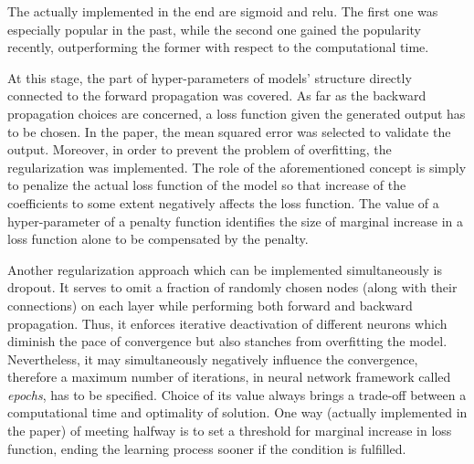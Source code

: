 \documentclass{Trade_template}
\numberwithin{equation}{section}
\begin{document}

The actually implemented in the end are sigmoid and relu. The first one was especially popular in the past, while the second one gained the popularity recently, outperforming the former with respect to the computational time.

At this stage, the part of hyper-parameters of models’ structure directly connected to the forward propagation was covered. As far as the backward propagation choices are concerned, a loss function given the generated output has to be chosen. In the paper, the mean squared error was selected to validate the output. Moreover, in order to prevent the problem of overfitting, the regularization was implemented. The role of the aforementioned concept is simply to penalize the actual loss function of the model so that increase of the coefficients to some extent negatively affects the loss function. The value of a hyper-parameter of a penalty function identifies the size of marginal increase in a loss function alone to be compensated by the penalty. 

Another regularization approach which can be implemented simultaneously is dropout. It serves to omit a fraction of randomly chosen nodes (along with their connections) on each layer while performing both forward and backward propagation. Thus, it enforces iterative deactivation of different neurons which diminish the pace of convergence but also stanches from overfitting the model. Nevertheless, it may simultaneously negatively influence the convergence, therefore a maximum number of iterations, in neural network framework called \textit{epochs}, has to be specified. Choice of its value always brings a trade-off between a computational time and optimality of solution. One way (actually implemented in the paper) of meeting halfway is to set a threshold for marginal increase in loss function, ending the learning process sooner if the condition is fulfilled.
\end{document}
